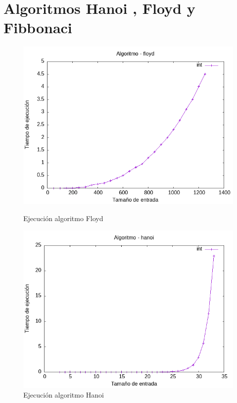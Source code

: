 \documentclass[11pt,openany]{book}
\begin{document}
    \section{Algoritmos Hanoi , Floyd y Fibbonaci}
    \begin{figure}[H]
        \begin{minipage}{0.5\textwidth}
            \centering
            \includegraphics[width=\linewidth]{assets/Img/floydint.png}
            \caption{Ejecución algoritmo Floyd}
            \label{fig:floyd}
        \end{minipage}
        \begin{minipage}{0.5\textwidth}
            \centering
            \includegraphics[width=\linewidth]{assets/Img/hanoiint.png}
            \caption{Ejecución algoritmo Hanoi}
            \label{fig:hanoi}
        \end{minipage}
    \end{figure}
\end{document}
